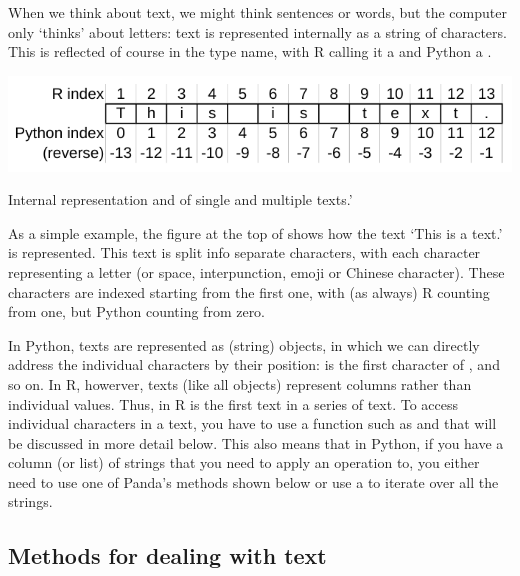 When we think about text, we might think sentences or words, but the computer only `thinks' about letters:
text is represented internally as a string of characters.
This is reflected of course in the type name, with R calling it a  and Python a .

\begin{ccsexample}
  \begin{center} \includegraphics[width=.6\textwidth]{chapter10/text.pdf}\end{center}
  

  \caption{Internal representation and of single and multiple texts.'}\label{ex:text}
\end{ccsexample}

As a simple example, the figure at the top of  shows how the text `This is a text.' is represented.
This text is split info separate characters, with each character representing a letter (or space, interpunction, emoji or Chinese character).
These characters are indexed starting from the first one, with (as always) R counting from one, but Python counting from zero.

In Python, texts are represented as  (string) objects, in which we can directly address the individual characters by their position:  is the first character of , and so on.
In R, howerver, texts (like all objects) represent columns rather than individual values.
Thus,  in R is the first text in a series of text.
To access individual characters in a text, you have to use a function such as  and  that will be discussed in more detail below. 
This also means that in Python, if you have a column (or list) of strings that you need to apply an operation to,
you either need to use one of Panda's methods shown below or use a  to iterate over all the strings.

\subsection{Methods for dealing with text}

